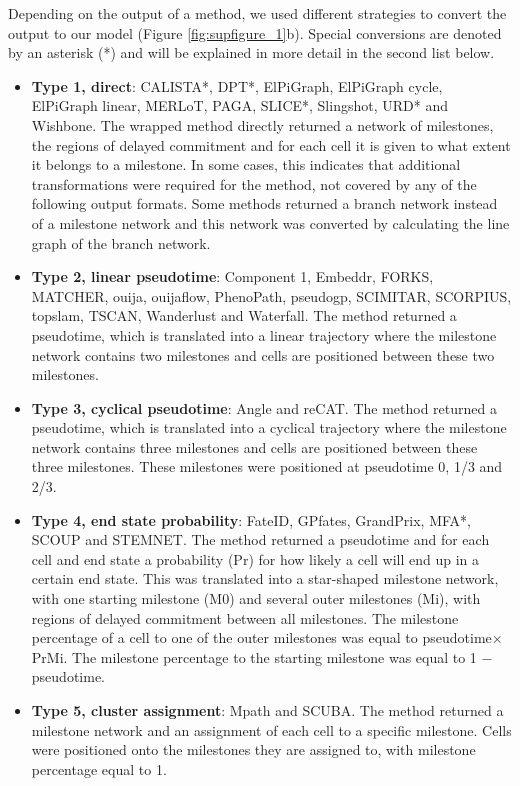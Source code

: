 Depending on the output of a method, we used different strategies to convert the output to our model (Figure \ref{fig:supfigure_1}b). Special conversions are denoted by an asterisk (*) and will be explained in more detail in the second list below.



\begin{itemize}
	\item \textbf{Type 1, direct}: CALISTA*, DPT*, ElPiGraph, ElPiGraph cycle, ElPiGraph linear, MERLoT, PAGA, SLICE*, Slingshot, URD* and Wishbone. The wrapped method directly returned a network of milestones, the regions of delayed commitment and for each cell it is given to what extent it belongs to a milestone. In some cases, this indicates that additional transformations were required for the method, not covered by any of the following output formats. Some methods returned a branch network instead of a milestone network and this network was converted by calculating the line graph of the branch network.
	\item \textbf{Type 2, linear pseudotime}: Component 1, Embeddr, FORKS, MATCHER, ouija, ouijaflow, PhenoPath, pseudogp, SCIMITAR, SCORPIUS, topslam, TSCAN, Wanderlust and Waterfall. The method returned a pseudotime, which is translated into a linear trajectory where the milestone network contains two milestones and cells are positioned between these two milestones.
	\item \textbf{Type 3, cyclical pseudotime}: Angle and reCAT. The method returned a pseudotime, which is translated into a cyclical trajectory where the milestone network contains three milestones and cells are positioned between these three milestones. These milestones were positioned at pseudotime 0, 1/3 and 2/3.
	\item \textbf{Type 4, end state probability}: FateID, GPfates, GrandPrix, MFA*, SCOUP and STEMNET. The method returned a pseudotime and for each cell and end state a probability (Pr) for how likely a cell will end up in a certain end state. This was translated into a star-shaped milestone network, with one starting milestone (M0) and several outer milestones (Mi), with regions of delayed commitment between all milestones. The milestone percentage of a cell to one of the outer milestones was equal to pseudotime$\times$PrMi. The milestone percentage to the starting milestone was equal to 1 $-$ pseudotime.
	\item \textbf{Type 5, cluster assignment}: Mpath and SCUBA. The method returned a milestone network and an assignment of each cell to a specific milestone. Cells were positioned onto the milestones they are assigned to, with milestone percentage equal to 1.

\end{itemize}
